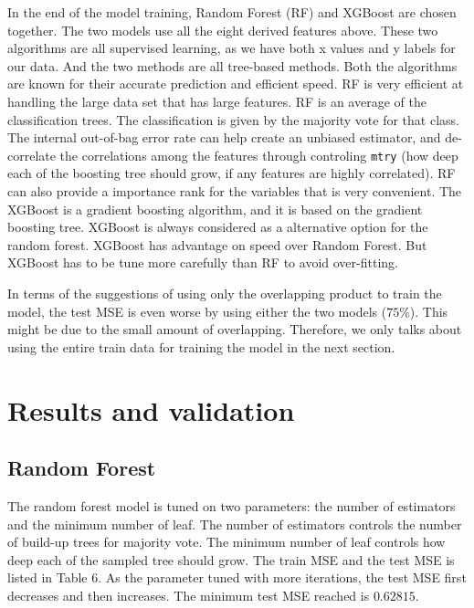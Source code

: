 \documentclass[11pt, titlepage]{article}
\begin{document}
\vspace{3mm} 
In the end of the model training, Random Forest (RF) and XGBoost are chosen together. The two models use all the eight derived features above. These two algorithms are all supervised learning, as we have both x values and y labels for our data. And the two methods are all tree-based methods. Both the algorithms are known for their accurate prediction and efficient speed. RF is very efficient at handling the large data set that has large features. RF is an average of the classification trees. The classification is given by the majority vote for that class. The internal out-of-bag error rate can help create an unbiased estimator, and de-correlate the correlations among the features through controling \texttt{mtry} (how deep each of the boosting tree should grow, if any features are highly correlated). RF can also provide a importance rank for the variables that is very convenient. The XGBoost is a gradient boosting algorithm, and it is based on the gradient boosting tree.  XGBoost is always considered as a alternative option for the random forest. XGBoost has advantage on speed over Random Forest. But XGBoost has to be tune more carefully than RF to avoid over-fitting. 

\vspace{3mm} 
In terms of the suggestions of using only the overlapping product to train the model, the test MSE is even worse by using either the two models ($75\%$). This might be due to the small amount of overlapping. Therefore, we only talks about using the entire train data for training the model in the next section.


\section{Results and validation}

\subsection{Random Forest}

The random forest model is tuned on two parameters: the number of estimators and the minimum number of leaf. The number of estimators controls the number of build-up trees for majority vote. The minimum number of leaf controls how deep each of the sampled tree should grow. The train MSE and the test MSE is listed in Table 6. As the parameter tuned with more iterations, the test MSE first decreases and then increases. The minimum test MSE reached is $0.62815$. 
\end{document}
